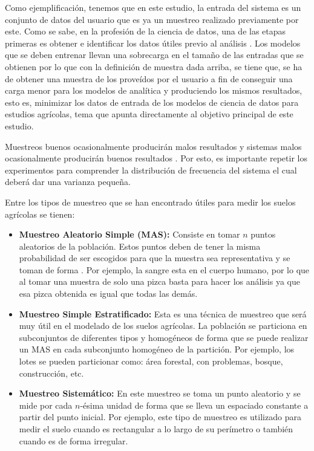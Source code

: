 \documentclass{report}
\begin{document}
Como ejemplificación, tenemos que en este estudio, la entrada del sistema es un conjunto de datos del usuario que es ya un muestreo realizado previamente por este. Como se sabe, en la profesión de la ciencia de datos, una de las etapas primeras es obtener e identificar los datos útiles previo al análisis \cite{university-of-wisconsin-data-science-2021}. Los modelos que se deben entrenar llevan una sobrecarga en el tamaño de las entradas que se obtienen por lo que con la definición de muestra dada arriba, se tiene que, se ha de obtener una muestra de los  proveídos por el usuario a fin de conseguir una carga menor para los modelos de analítica y produciendo los mismos resultados, esto es, minimizar los datos de entrada de los modelos de ciencia de datos para estudios agrícolas, tema que apunta directamente al objetivo principal de este estudio.

\bigbreak

Muestreos buenos ocasionalmente producirán malos resultados y sistemas malos ocasionalmente producirán buenos resultados \cite{gulland-1966}. Por esto, es importante repetir los experimentos para comprender la distribución de frecuencia del sistema el cual deberá dar una varianza pequeña.

\bigbreak

Entre los tipos de muestreo que se han encontrado útiles para medir los suelos agrícolas se tienen:

\begin{itemize}
    \item \textbf{Muestreo Aleatorio Simple (MAS):} Consiste en tomar $n$ puntos aleatorios de la población. Estos puntos deben de tener la misma probabilidad de ser escogidos para que la muestra sea representativa y se toman de forma . Por ejemplo, la sangre esta  en el cuerpo humano, por lo que al tomar una muestra de solo una pizca basta para hacer los análisis ya que esa pizca obtenida es igual que todas las demás.
    
    \item \textbf{Muestreo Simple Estratificado:} Esta es una técnica de muestreo que será muy útil en el modelado de los suelos agrícolas. La población se particiona en subconjuntos de diferentes tipos y homogéneos de forma que se puede realizar un MAS en cada subconjunto homogéneo de la partición. Por ejemplo, los lotes se pueden particionar como: área forestal, con problemas, bosque, construcción, etc.
    
    \item \textbf{Muestreo Sistemático:} En este muestreo se toma un punto aleatorio y se mide por cada $n$-ésima unidad de forma que se lleva un espaciado constante a partir del punto inicial. Por ejemplo, este tipo de muestreo es utilizado para medir el suelo cuando es rectangular a lo largo de su perímetro o también cuando es de forma irregular.
\end{itemize}
\end{document}
